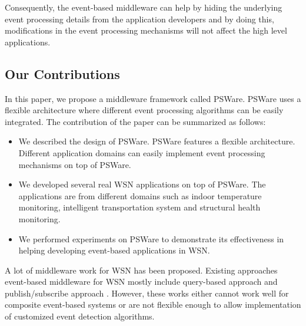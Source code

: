 Consequently, the event-based middleware can help by hiding the underlying event processing details from the application developers and by doing this, modifications in the event processing mechanisms will not affect the high level applications. 

\subsection{Our Contributions}
In this paper, we propose a middleware framework called PSWare. PSWare uses a flexible architecture where different event processing algorithms can be easily integrated. The contribution of the paper can be summarized as follows:
\begin{itemize}
\item We described the design of PSWare. PSWare features a flexible architecture. Different application domains can easily implement event processing mechanisms on top of PSWare.
\item We developed several real WSN applications on top of PSWare. The applications are from different domains such as indoor temperature monitoring, intelligent transportation system and structural health monitoring.
\item We performed experiments on PSWare to demonstrate its effectiveness in helping developing event-based applications in WSN.
\end{itemize}

A lot of middleware work for WSN has been proposed. Existing approaches event-based middleware for WSN mostly include query-based approach \cite{tinydb} and publish/subscribe approach \cite{complexevent}. However, these works either cannot work well for composite event-based systems or are not flexible enough to allow implementation of customized event detection algorithms. 



